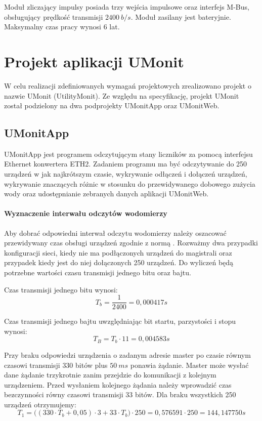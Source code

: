 Moduł zliczający impulsy posiada trzy wejścia impulsowe oraz interfejs M-Bus, obsługujący prędkość transmisji $ 2400\ b/s $.
Moduł zasilany jest bateryjnie.
Maksymalny czas pracy wynosi 6 lat.

\section{Projekt aplikacji UMonit}

W celu realizacji zdefiniowanych wymagań projektowych zrealizowano projekt o nazwie UMonit (UtilityMonit).
Ze względu na specyfikację, projekt UMonit został podzielony na dwa podprojekty UMonitApp oraz UMonitWeb.

\subsection{UMonitApp}

UMonitApp jest programem odczytującym stany liczników za pomocą interfejsu Ethernet konwertera ETH2.
Zadaniem programu ma być odczytywanie do 250 urządzeń w jak najkrótszym czasie, wykrywanie odłączeń i dołączeń urządzeń,
wykrywanie znaczących różnic w stosunku do przewidywanego dobowego zużycia wody oraz udostępnianie zebranych danych aplikacji UMonitWeb.

\paragraph{Wyznaczenie interwału odczytów wodomierzy}

Aby dobrać odpowiedni interwał odczytu wodomierzy należy oszacować przewidywany czas obsługi urządzeń zgodnie z normą \cite{pnen137573}.
Rozważmy dwa przypadki konfiguracji sieci, kiedy nie ma podłączonych urządzeń do magistrali oraz przypadek kiedy jest do niej dołączonych 250 urządzeń.
Do wyliczeń będą potrzebne wartości czasu transmisji jednego bitu oraz bajtu.

Czas transmisji jednego bitu wynosi:
\begin{equation}
	\label{eq:bit_time}
	T_b = \frac{1}{2400} = 0,000417 s
\end{equation}

Czas transmisji jednego bajtu uwzględniając bit startu, parzystości i stopu wynosi:
\begin{equation}
	\label{eq:byte_time}
	T_B = T_b \cdot 11 = 0,004583 s
\end{equation}

Przy braku odpowiedzi urządzenia o zadanym adresie master po czasie równym czasowi transmisji $ 330 $ bitów plus $ 50\ ms $ ponawia żądanie.
Master może wysłać dane żądanie trzykrotnie zanim przejdzie do komunikacji z kolejnym urządzeniem.
Przed wysłaniem kolejnego żądania należy wprowadzić czas bezczynności równy czasowi transmisji $ 33 $ bitów.
Dla braku wszystkich 250 urządzeń otrzymujemy:
\begin{equation}
	\label{eq:no_devices_time}
	T_1 = \big((330 \cdot T_b + 0,05) \cdot 3 + 33 \cdot T_b \big) \cdot 250 = 0,576591 \cdot 250 = 144,147750 s
\end{equation}

